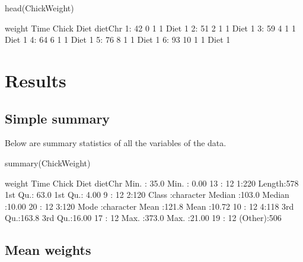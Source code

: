 \documentclass[10pt]{article}
\newenvironment{CodeChunk}{}{}
\begin{document}
\begin{CodeChunk}
\begin{CodeInput}
head(ChickWeight)
\end{CodeInput}
\begin{CodeOutput}
   weight Time Chick Diet dietChr
1:     42    0     1    1  Diet 1
2:     51    2     1    1  Diet 1
3:     59    4     1    1  Diet 1
4:     64    6     1    1  Diet 1
5:     76    8     1    1  Diet 1
6:     93   10     1    1  Diet 1
\end{CodeOutput}
\end{CodeChunk}

\section*{Results}\label{results}

\subsection*{Simple summary}\label{simple-summary}

Below are summary statistics of all the variables of the data.

\begin{CodeChunk}
\begin{CodeInput}
summary(ChickWeight)
\end{CodeInput}
\begin{CodeOutput}
     weight           Time           Chick     Diet      dietChr         
 Min.   : 35.0   Min.   : 0.00   13     : 12   1:220   Length:578        
 1st Qu.: 63.0   1st Qu.: 4.00   9      : 12   2:120   Class :character  
 Median :103.0   Median :10.00   20     : 12   3:120   Mode  :character  
 Mean   :121.8   Mean   :10.72   10     : 12   4:118                     
 3rd Qu.:163.8   3rd Qu.:16.00   17     : 12                             
 Max.   :373.0   Max.   :21.00   19     : 12                             
                                 (Other):506                             
\end{CodeOutput}
\end{CodeChunk}

\subsection*{Mean weights}\label{mean-weights}
\end{document}
